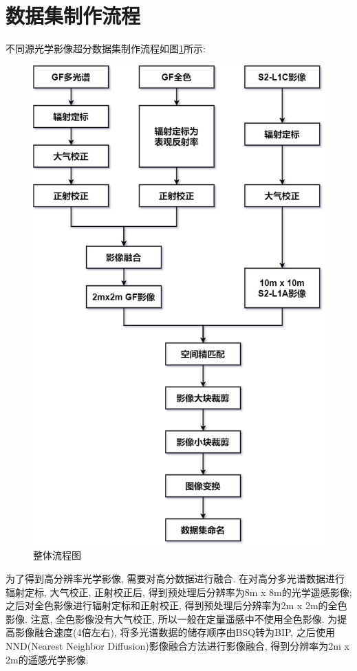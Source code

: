 \section{数据集制作流程}

不同源光学影像超分数据集制作流程如图\ref{fig:0101}所示:

\begin{figure}[htbp]
    \centering
    \includegraphics[height=0.7\textheight]{pic/chap01.png}
    \caption{整体流程图}
    \label{fig:0101}
\end{figure}

为了得到高分辨率光学影像, 需要对高分数据进行融合. 在对高分多光谱数据进行辐射定标, 大气校正, 正射校正后, 得到预处理后分辨率为8m x 8m的光学遥感影像; 之后对全色影像进行辐射定标和正射校正, 得到预处理后分辨率为2m x 2m的全色影像. 注意, 全色影像没有大气校正, 所以一般在定量遥感中不使用全色影像. 为提高影像融合速度(4倍左右), 将多光谱数据的储存顺序由BSQ转为BIP, 之后使用NND(Nearest Neighbor Diffusion)影像融合方法进行影像融合, 得到分辨率为2m x 2m的遥感光学影像.

